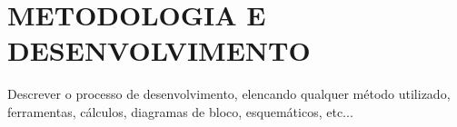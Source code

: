 \section{METODOLOGIA E DESENVOLVIMENTO} \label{sec:metodologia}

Descrever o processo de desenvolvimento, elencando qualquer método utilizado, ferramentas, cálculos, diagramas de bloco, esquemáticos, etc...